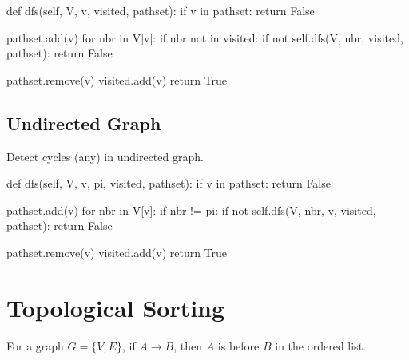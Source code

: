 \begin{python}
def dfs(self, V, v, visited, pathset):
  if v in pathset:
    return False

  pathset.add(v)
  for nbr in V[v]:
    if nbr not in visited:
      if not self.dfs(V, nbr, visited, pathset):
        return False

  pathset.remove(v)
  visited.add(v)
  return True
\end{python}


\subsection{Undirected Graph}
Detect cycles (any) in undirected graph.

\begin{python}
def dfs(self, V, v, pi, visited, pathset):
  if v in pathset:
    return False

  pathset.add(v)
  for nbr in V[v]:
    if nbr != pi:
      if not self.dfs(V, nbr, v, visited, pathset):
        return False

  pathset.remove(v)
  visited.add(v)
  return True
\end{python}

\section{Topological Sorting}
For a graph $G=\{V, E\}$, if $A \rightarrow B $, then $A$ is before $B$ in the ordered list. 
